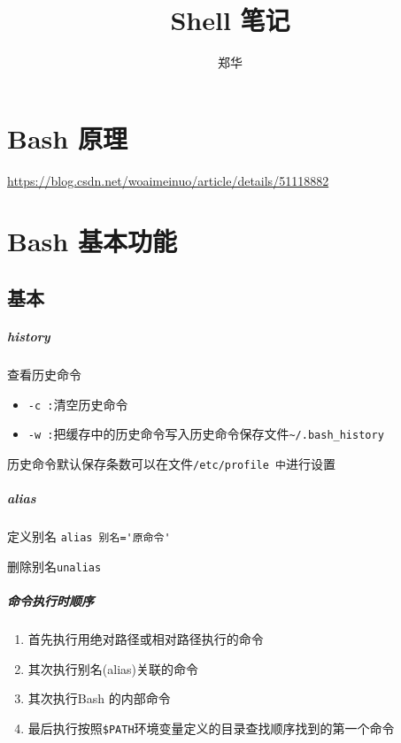 \documentclass[UTF8,a4paper,12pt]{ctexbook}
\author{\kaishu 郑华}
\title{Shell 笔记}
\begin{document}
 	\maketitle
 	\tableofcontents

\chapter{Bash 原理}
	\url{https://blog.csdn.net/woaimeinuo/article/details/51118882}

\chapter{Bash 基本功能}
	\section{基本}
		\paragraph{history}查看历史命令
			\begin{itemize}
				\item \verb|-c :|清空历史命令
				\item \verb|-w :|把缓存中的历史命令写入历史命令保存文件\verb|~/.bash_history|
			\end{itemize}
			
			历史命令默认保存条数可以在文件\verb|/etc/profile 中|进行设置
			
		\paragraph{alias}定义别名 \verb|alias 别名='原命令'|
		
			删除别名\verb|unalias|
		
		\paragraph{命令执行时顺序}
			\begin{enumerate}
				\item 首先执行用绝对路径或相对路径执行的命令
				\item 其次执行别名(alias)关联的命令
				\item 其次执行Bash 的内部命令
				\item 最后执行按照\verb|$PATH|环境变量定义的目录查找顺序找到的第一个命令
			\end{enumerate}
		
\end{document}
